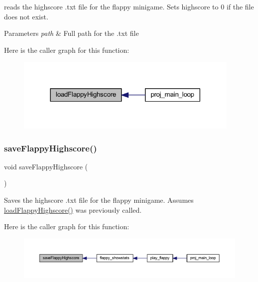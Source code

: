reads the highscore .txt file for the flappy minigame. Sets highscore to 0 if the file does not exist. 


\begin{DoxyParams}{Parameters}
{\em path} & Full path for the .txt file \\
\hline
\end{DoxyParams}
Here is the caller graph for this function\+:\nopagebreak
\begin{figure}[H]
\begin{center}
\leavevmode
\includegraphics[width=305pt]{group__flappy_ga48334c3029c7f0bbe6b07d3423a6702e_icgraph}
\end{center}
\end{figure}
\mbox{\label{group__flappy_ga9932d7d9d11b03bcbd7d82d8c6c36a22}} 
\subsubsection{\texorpdfstring{save\+Flappy\+Highscore()}{saveFlappyHighscore()}}
{\footnotesize\ttfamily void save\+Flappy\+Highscore (\begin{DoxyParamCaption}{ }\end{DoxyParamCaption})}



Saves the highscore .txt file for the flappy minigame. Assumes \mbox{\hyperlink{group__flappy_ga48334c3029c7f0bbe6b07d3423a6702e}{load\+Flappy\+Highscore()}} was previously called. 

Here is the caller graph for this function\+:\nopagebreak
\begin{figure}[H]
\begin{center}
\leavevmode
\includegraphics[width=350pt]{group__flappy_ga9932d7d9d11b03bcbd7d82d8c6c36a22_icgraph}
\end{center}
\end{figure}
\mbox{\label{group__flappy_ga5c94499758654ce3c58278cdacb968c2}} 
